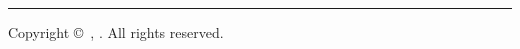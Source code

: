 %
%
%
\begin{titlepage}
    \raggedleft
    \hfill
    \vfill
    {\LARGE\textsc{\thetitle}\par}
    \rule{\textwidth}{.4pt}\par
    {\Large\textsc{\theauthor}\par}
    \vspace{5em}
    {\large\itshape\degree\par}
    \vspace{0.5em}
    {\large\itshape\university\par}
    \vfill
    \makeatletter
    \centering
    {\large\@dtm@ini@year\par}
    \vspace{0.5em}
    Copyright \copyright\ \theauthor, \@dtm@ini@year.
    All rights reserved.
    \makeatother
\end{titlepage}
